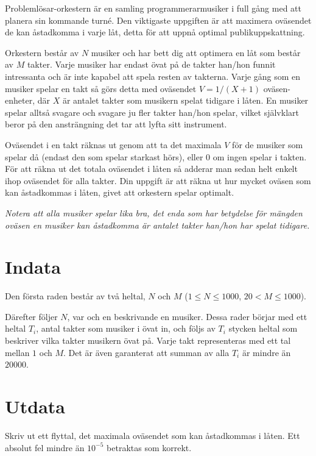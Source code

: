 
Problemlösar-orkestern är en samling programmerarmusiker i full gång med att planera sin kommande turné. Den viktigaste uppgiften är att maximera oväsendet de kan åstadkomma i varje låt, detta för att uppnå optimal publikuppskattning.

Orkestern består av $N$ musiker och har bett dig att optimera en låt som består av $M$ takter. Varje musiker har endast övat på de takter han/hon funnit intressanta och är inte kapabel att spela resten av takterna. Varje gång som en musiker spelar en takt så görs detta med oväsendet $V=1/(X+1)$ oväsen-enheter, där $X$ är antalet takter som musikern spelat tidigare i låten. En musiker spelar alltså svagare och svagare ju fler takter han/hon spelar, vilket självklart beror på den ansträngning det tar att lyfta sitt instrument.

Oväsendet i en takt räknas ut genom att ta det maximala $V$ för de musiker som spelar då (endast den som spelar starkast hörs), eller $0$ om ingen spelar i takten. För att räkna ut det totala oväsendet i låten så adderar man sedan helt enkelt ihop oväsendet för alla takter. Din uppgift är att räkna ut hur mycket oväsen som kan åstadkommas i låten, givet att orkestern spelar optimalt.

\emph{Notera att alla musiker spelar lika bra, det enda som har betydelse för mängden oväsen en musiker kan åstadkomma är antalet takter han/hon har spelat tidigare.}

\section*{Indata}
Den första raden består av två heltal, $N$ och $M$ ($1 \leq N \leq 1000$, $20 < M \leq 1000$).

Därefter följer $N$, var och en beskrivande en musiker. Dessa rader börjar med ett heltal $T_i$,
antal takter som musiker i övat in, och följs av $T_i$ stycken heltal som beskriver vilka takter
musikern övat på. Varje takt representeras med ett tal mellan $1$ och $M$.
Det är även garanterat att summan av alla $T_i$ är mindre än $20000$.

\section*{Utdata}
Skriv ut ett flyttal, det maximala oväsendet som kan åstadkommas i låten. Ett absolut fel mindre än $10^{-5}$ betraktas som korrekt.

